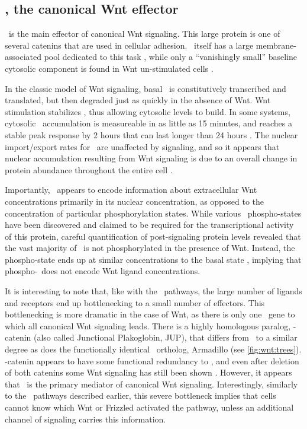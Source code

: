 	

\subsection{\bcat, the canonical Wnt effector}
\label{pathways:wnt:bcat}


\bcat\ is the main effector of canonical Wnt signaling. This
large protein is one of several catenins that are
used in cellular adhesion. \bcat\ itself has a large
membrane-associated pool dedicated to this task \cite{Jamieson2012}, while only a
``vanishingly small'' baseline cytosolic component is found
in Wnt un-stimulated cells \cite{Li2012}.


In the classic model of Wnt signaling, basal
\bcat\ is constitutively transcribed and translated, but then degraded
just as quickly in the absence of Wnt. Wnt stimulation stabilizes
\bcat, thus allowing cytosolic levels to build. In some systems,
cytosolic \bcat\ accumulation is measureable in as little as 15 minutes,
and reaches a stable peak response by 2 hours that can last longer
than 24 hours \cite{Li2012,Hernandez2012}.
The nuclear import/export rates for \bcat\ are unaffected by signaling,
and so it appears that nuclear accumulation resulting from Wnt 
signaling is due to an
overall change in protein abundance throughout the entire cell 
\cite{MacDonald2009,Clevers2006}.


Importantly, \bcat\ appears to encode information about extracellular
Wnt concentrations primarily in its nuclear concentration, as opposed to the
concentration of particular phosphorylation states. While various \bcat\ 
phospho-states have been discovered and claimed to
be required for the transcriptional activity of this protein, careful
quantification of post-signaling protein levels revealed that the vast
majority of \bcat\ is not phosphorylated in the presence of Wnt. Instead,
the phospho-state ends up at similar concentrations to the basal state \cite{Hernandez2012},
implying that phospho-\bcat\ does not encode Wnt ligand concentrations.


It is interesting to note that, like with the \tgfbsf\ pathways, the large
number of ligands and receptors end up bottlenecking to a small number of
effectors. This bottlenecking is more dramatic in the case of Wnt, as there
is only one \bcat\ gene to which all canonical Wnt signaling leads.
There is a highly homologous paralog, \textgamma-catenin
(also called Junctional Plakoglobin, JUP),
that differs from \bcat\ to a similar degree as does the functionally identical
\fly\ ortholog, Armadillo (see \autoref{fig:wnt:trees}). \textgamma-catenin
appears to have some functional redundancy to \bcat, and even after deletion of
both catenins some Wnt signaling has still been shown \cite{Malhotra2009}.
However, it appears that \bcat\ is the primary mediator of canonical Wnt
signaling. Interestingly, similarly to the \tgfbsf\ pathways described
earlier, this severe bottleneck implies that cells cannot
know which Wnt or Frizzled activated the pathway, unless an additional channel
of signaling carries this information.


